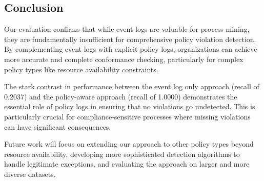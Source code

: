 \subsection{Conclusion}

Our evaluation confirms that while event logs are valuable for process mining, they are fundamentally insufficient for comprehensive policy violation detection. By complementing event logs with explicit policy logs, organizations can achieve more accurate and complete conformance checking, particularly for complex policy types like resource availability constraints.

The stark contrast in performance between the event log only approach (recall of 0.2037) and the policy-aware approach (recall of 1.0000) demonstrates the essential role of policy logs in ensuring that no violations go undetected. This is particularly crucial for compliance-sensitive processes where missing violations can have significant consequences.

Future work will focus on extending our approach to other policy types beyond resource availability, developing more sophisticated detection algorithms to handle legitimate exceptions, and evaluating the approach on larger and more diverse datasets.
